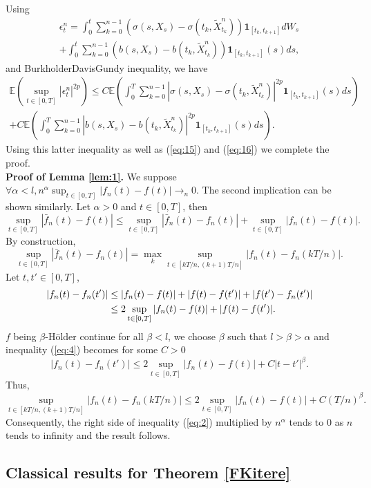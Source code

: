 \documentclass[a4paper, 11pt]{article}
\newcommand{\E}{\mathbb{E}}
\newcommand{\1}{\mathbf{1}}
\begin{document}
Using
\begin{multline*}
\epsilon_t^n=\int_0^t \sum_{k=0}^{n-1}(\sigma(s,X_s)-\sigma(t_k,\tilde{X}_{t_k}^n))\1_{[t_k,t_{k+1}]}dW_s\\
+\int_0^t \sum_{k=0}^{n-1}(b(s,X_s)-b(t_k,\tilde{X}_{t_k}^n))\1_{[t_k,t_{k+1}]}(s)ds,
\end{multline*}
and BurkholderDavisGundy inequality, we have
\begin{multline*}
\E (\sup_{t\in [0,T]} |\epsilon_t^n|^{2p})\leq C \E(\int_0^T \sum_{k=0}^{n-1}|\sigma(s,X_s)-\sigma(t_k,\tilde{X}_{t_k}^n)|^{2p}\1_{[t_k,t_{k+1}]}(s)ds)\\
+C\E(\int_0^T \sum_{k=0}^{n-1}|b(s,X_s)-b(t_k,\tilde{X}_{t_k}^n)|^{2p}\1_{[t_k,t_{k+1}]}(s)ds).
\end{multline*}
Using this latter inequality as well as (\ref{eq:15}) and (\ref{eq:16}) we complete the proof.
\hfill \framebox[0.6em]{}\\



\noindent\textbf{Proof of Lemma \ref{lem:1}.}
We suppose $\forall \alpha<l, n^\alpha \sup_{t\in[0,T]} |f_n(t)-f(t)|\rightarrow_n 0$. The second implication can be shown similarly. Let $\alpha>0$ and $t\in [0,T]$, then
\begin{equation}
\label{eq:2}
\sup_{t\in[0,T]}|\bar{f}_n(t)-f(t)|\leq \sup_{t\in[0,T]}|\bar{f}_n(t)-f_n(t)|+\sup_{t\in[0,T]}|f_n(t)-f(t)|.
\end{equation}
By construction,
$$\sup_{t\in[0,T]}|\bar{f}_n(t)-f_n(t)|=\max_k \sup_{t\in [kT/n,(k+1)T/n]}|f_n(t)-f_n(kT/n)|.$$
Let $t, t'\in[0,T]$,
\begin{align}
|f_n(t)-f_n(t')|&\leq |f_n(t)-f(t)|+|f(t)-f(t')|+|f(t')-f_n(t')|\notag \\
&\leq 2\sup_{t\in[0,T]}|f_n(t)-f(t)|+|f(t)-f(t')|.\label{eq:4}
\end{align}
$f$ being $\beta$-H\" older continue for all $\beta<l$, we choose $\beta$ such that $l>\beta>\alpha$ and 
inequality (\ref{eq:4}) becomes for some $C>0$
\begin{equation}
\label{eq:5}
|f_n(t)-f_n(t')|\leq 2\sup_{t\in[0,T]}|f_n(t)-f(t)|+C|t-t'|^\beta.
\end{equation}
Thus,
$$\sup_{t\in [kT/n,(k+1)T/n]}|f_n(t)-f_n(kT/n)|\leq 2\sup_{t\in[0,T]}|f_n(t)-f(t)|+C(T/n)^\beta.$$
Consequently, the right side of inequality (\ref{eq:2}) multiplied by $n^\alpha$ tends to $0$ as $n$ tends to infinity and the result follows.\hfill \framebox[0.6em]{}

\subsection{Classical results for Theorem \ref{FKitere}}
\end{document}
